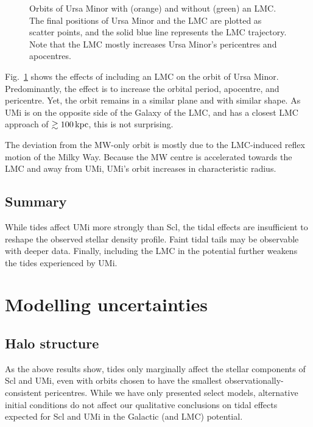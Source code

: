 \begin{figure}
\centering
{}
\caption[Ursa Minor orbits with LMC]{Orbits of Ursa Minor with (orange)
and without (green) an LMC. The final positions of Ursa Minor and the
LMC are plotted as scatter points, and the solid blue line represents
the LMC trajectory. Note that the LMC mostly increases Ursa Minor's
pericentres and apocentres.}\label{fig:umi_orbits_lmc}
\end{figure}

Fig.~\ref{fig:umi_orbits_lmc} shows the effects of including an LMC on
the orbit of Ursa Minor. Predominantly, the effect is to increase the
orbital period, apocentre, and pericentre. Yet, the orbit remains in a
similar plane and with similar shape. As UMi is on the opposite side of
the Galaxy of the LMC, and has a closest LMC approach of
\(\gtrsim 100\,{\rm kpc}\), this is not surprising.

The deviation from the MW-only orbit is mostly due to the LMC-induced
reflex motion of the Milky Way. Because the MW centre is accelerated
towards the LMC and away from UMi, UMi's orbit increases in
characteristic radius.

\subsection{Summary}\label{summary-1}

While tides affect UMi more strongly than Scl, the tidal effects are
insufficient to reshape the observed stellar density profile. Faint
tidal tails may be observable with deeper data. Finally, including the
LMC in the potential further weakens the tides experienced by UMi.

\section{Modelling uncertainties}\label{modelling-uncertainties}

\subsection{Halo structure}\label{halo-structure}

As the above results show, tides only marginally affect the stellar
components of Scl and UMi, even with orbits chosen to have the smallest
observationally-consistent pericentres. While we have only presented
select models, alternative initial conditions do not affect our
qualitative conclusions on tidal effects expected for Scl and UMi in the
Galactic (and LMC) potential.

